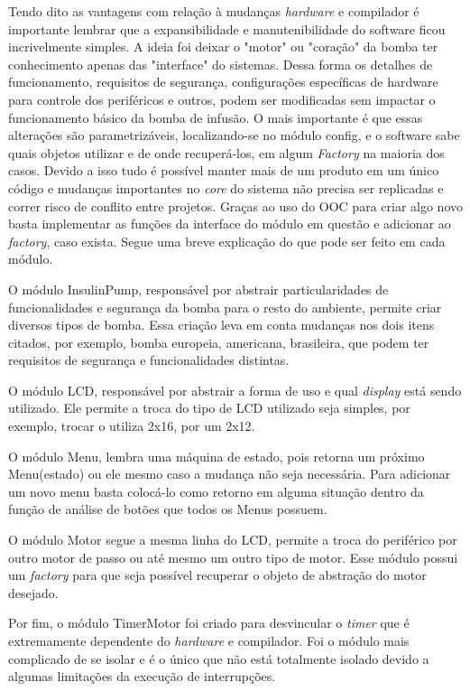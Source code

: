 Tendo dito as vantagens com relação à mudanças \emph{hardware} e compilador é importante lembrar que a expansibilidade e manutenibilidade do software ficou incrivelmente simples. A ideia foi deixar o "motor" ou "coração" da bomba ter conhecimento apenas das "interface" do sistemas. Dessa forma os detalhes de funcionamento, requisitos de segurança, configurações específicas de hardware para controle dos periféricos e outros, podem ser modificadas sem impactar o funcionamento básico da bomba de infusão. O mais importante é que essas alterações são parametrizáveis, localizando-se no módulo config, e o software sabe quais objetos utilizar e de onde recuperá-los, em algum \emph{Factory} na maioria dos casos. Devido a isso tudo é possível manter mais de um produto em um único código e mudanças importantes no \emph{core} do sistema não precisa ser replicadas e correr risco de conflito entre projetos. Graças ao uso do OOC para criar algo novo basta implementar as funções da interface do módulo em questão e adicionar ao \emph{factory}, caso exista. Segue uma breve explicação do que pode ser feito em cada módulo.

O módulo InsulinPump, responsável por abstrair particularidades de funcionalidades e segurança da bomba para o resto do ambiente, permite criar diversos tipos de bomba. Essa criação leva em conta mudanças nos dois itens citados, por exemplo, bomba europeia, americana, brasileira, que podem ter requisitos de segurança e funcionalidades distintas.

O módulo LCD, responsável por abstrair a forma de uso e qual \emph{display} está sendo utilizado. Ele permite a troca do tipo de LCD utilizado seja simples, por exemplo, trocar o utiliza 2x16, por um 2x12.

O módulo Menu, lembra uma máquina de estado, pois retorna um próximo Menu(estado) ou ele mesmo caso a mudança não seja necessária. Para adicionar um novo menu basta colocá-lo como retorno em alguma situação dentro da função de análise de botões que todos os Menus possuem.

O módulo Motor segue a mesma linha do LCD, permite a troca do periférico por outro motor de passo ou até mesmo um outro tipo de motor. Esse módulo possui um \emph{factory} para que seja possível recuperar o objeto de abstração do motor desejado.

Por fim, o módulo TimerMotor foi criado para desvincular o \emph{timer} que é extremamente dependente do \emph{hardware} e compilador. Foi o módulo mais complicado de se isolar e é o único que não está totalmente isolado devido a algumas limitações da execução de interrupções.